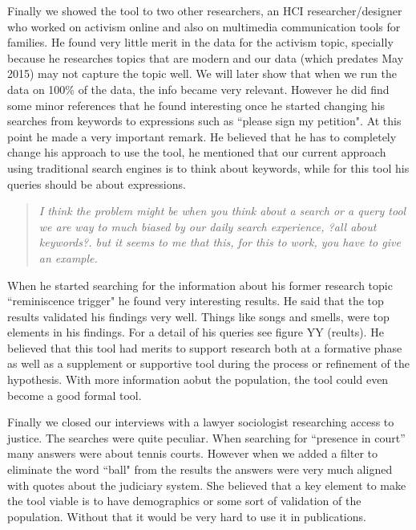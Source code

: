 \documentclass{sigchi}
\begin{document}
Finally we showed the tool to two other researchers, an HCI researcher/designer who worked on activism online and also on multimedia communication tools for families. He found very little merit in the data for the activism topic, specially because he researches topics that are modern and our data (which predates May 2015) may not capture the topic well. We will later show that when we run the data on 100\% of the data, the info became very relevant. However he did find some minor references that he found interesting once he started changing his searches from keywords to expressions such as ``please sign my petition". At this point he made a very important remark. He believed that he has to completely change his approach to use the tool, he mentioned that our current approach using traditional search engines is to think about keywords, while for this tool his queries should be about expressions. 

\begin{quote}
{\em
I think the problem might be when you think about a search or a query tool we are way to much biased by our daily search experience, ?all about keywords?. but it seems to me that this, for this to work, you have to give an example.
}\end{quote}

When he started searching for the information about his former research topic ``reminiscence trigger" he found very interesting results. He said that the top results validated his findings very well. Things like songs and smells, were top elements in his findings. For a detail of his queries see figure YY (reults). He believed that this tool had merits to support research both at a formative phase as well as a supplement or supportive tool during the process or refinement of the hypothesis. With more information aobut the population, the tool could even become a good formal tool.

Finally we closed our interviews with a lawyer sociologist researching access to justice. The searches were quite peculiar. When searching for ``presence in court'' many answers were about tennis courts. However when we added a filter to eliminate the word ``ball" from the results the answers were very much aligned with quotes about the judiciary system. She believed that a key element to make the tool viable is to have demographics or some sort of validation of the population. Without that it would be very hard to use it in publications.
\end{document}
